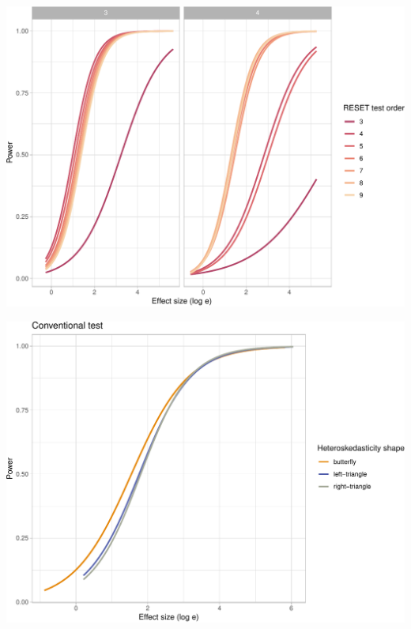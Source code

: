 \documentclass[]{interact}
\theoremstyle{plain}%
\theoremstyle{definition}
\theoremstyle{remark}
\begin{document}
\begin{center}\includegraphics[width=1\linewidth]{paper_comparison_files/figure-latex/unnamed-chunk-11-1} \end{center}

\begin{center}\includegraphics[width=1\linewidth]{paper_comparison_files/figure-latex/unnamed-chunk-12-1} \end{center}
\end{document}
